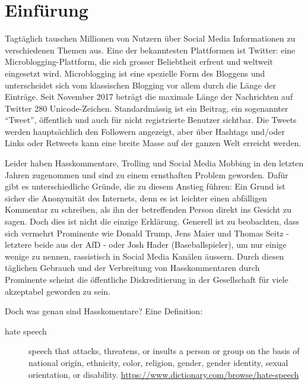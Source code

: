 \chapter{Einf\"urung}
\label{chap:introduction}
Tagt{\"a}glich tauschen Millionen von Nutzern {\"u}ber Social Media Informationen zu verschiedenen Themen aus. Eine der bekanntesten Plattformen ist Twitter: eine Microblogging-Plattform, die sich grosser Beliebtheit erfreut und weltweit eingesetzt wird. Microblogging ist eine spezielle Form des Bloggens und unterscheidet sich vom klassischen Blogging vor allem durch die L{\"a}nge der Eintr{\"a}ge. Seit November 2017 betr{\"a}gt die maximale L{\"a}nge der Nachrichten auf Twitter 280 Unicode-Zeichen. Standardm{\"a}ssig ist ein Beitrag, ein sogenannter ``Tweet'', {\"o}ffentlich und auch f{\"u}r nicht registrierte Benutzer sichtbar. Die Tweets werden haupts{\"a}chlich den Followern angezeigt, aber {\"u}ber Hashtags und/oder Links oder Retweets kann eine breite Masse auf der ganzen Welt erreicht werden.

Leider haben Hasskommentare, Trolling und Social Media Mobbing in den letzten Jahren zugenommen und sind zu einem ernsthaften Problem geworden. Daf{\"u}r gibt es unterschiedliche Gr{\"u}nde, die zu diesem Anstieg f{\"u}hren: Ein Grund ist sicher die Anonymit{\"a}t des Internets, denn es ist leichter einen abf{\"a}lligen Kommentar zu schreiben, als ihn der betreffenden Person direkt ins Gesicht zu sagen. Doch dies ist nicht die einzige Erkl{\"a}rung. Generell ist zu beobachten, dass sich vermehrt Prominente wie Donald Trump, Jens Maier und Thomas Seitz - letztere beide aus der AfD - oder Josh Hader (Baseballspieler), um nur einige wenige zu nennen, rassistisch in Social Media Kan{\"a}len {\"a}ussern. Durch diesen t{\"a}glichen Gebrauch und der Verbreitung von Hasskommentaren durch Prominente scheint die {\"o}ffentliche Diskreditierung in der Gesellschaft f{\"u}r viele akzeptabel geworden zu sein. 

Doch was genau sind Hasskomentare? Eine Definition: 
\begin{description}
\item[hate speech] speech that attacks, threatens, or insults a person or group on the basis of national origin, ethnicity, color, religion, gender, gender identity, sexual orientation, or disability.  \url{https://www.dictionary.com/browse/hate-speech}
\end{description}

